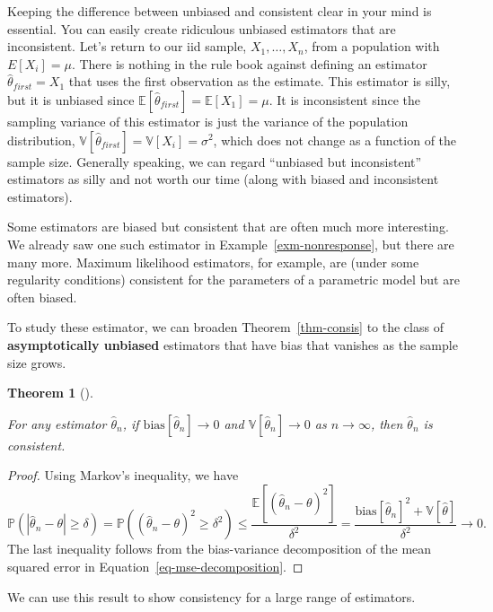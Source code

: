 \documentclass[
  13pt,
  letterpaper,
  DIV=11,
  numbers=noendperiod]{scrreprt}
\newcommand{\E}{\mathbb{E}}
\newcommand{\V}{\mathbb{V}}
\renewcommand{\P}{\mathbb{P}}
\theoremstyle{plain}
\newtheorem{theorem}{Theorem}[chapter]
\theoremstyle{definition}
\theoremstyle{definition}
\theoremstyle{remark}
\begin{document}
Keeping the difference between unbiased and consistent clear in your
mind is essential. You can easily create ridiculous unbiased estimators
that are inconsistent. Let's return to our iid sample,
\(X_1, \ldots, X_n\), from a population with \(E[X_i] = \mu\). There is
nothing in the rule book against defining an estimator
\(\widehat{\theta}_{first} = X_1\) that uses the first observation as
the estimate. This estimator is silly, but it is unbiased since
\(\E[\widehat{\theta}_{first}] = \E[X_1] = \mu\). It is inconsistent
since the sampling variance of this estimator is just the variance of
the population distribution,
\(\V[\widehat{\theta}_{first}] = \V[X_i] = \sigma^2\), which does not
change as a function of the sample size. Generally speaking, we can
regard ``unbiased but inconsistent'' estimators as silly and not worth
our time (along with biased and inconsistent estimators).

Some estimators are biased but consistent that are often much more
interesting. We already saw one such estimator in
Example~\ref{exm-nonresponse}, but there are many more. Maximum
likelihood estimators, for example, are (under some regularity
conditions) consistent for the parameters of a parametric model but are
often biased.

To study these estimator, we can broaden Theorem~\ref{thm-consis} to the
class of \textbf{asymptotically unbiased} estimators that have bias that
vanishes as the sample size grows.

\begin{theorem}[]\protect\hypertarget{thm-consis-2}{}\label{thm-consis-2}

For any estimator \(\widehat{\theta}_n\), if
\(\text{bias}[\widehat{\theta}_n] \to 0\) and
\(\V[\widehat{\theta}_n] \rightarrow 0\) as \(n\rightarrow \infty\),
then \(\widehat{\theta}_n\) is consistent.

\end{theorem}

\begin{proof}
Using Markov's inequality, we have \[
\P\left( |\widehat{\theta}_n - \theta| \geq \delta \right) = \P((\widehat{\theta}_n-\theta)^2 \geq \delta^2) \leq \frac{\E[(\widehat{\theta}_n - \theta)^2]}{\delta^2} = \frac{\text{bias}[\widehat{\theta}_n]^2 + \V[\widehat{\theta}]}{\delta^2} \to 0.
\] The last inequality follows from the bias-variance decomposition of
the mean squared error in Equation~\ref{eq-mse-decomposition}.
\end{proof}

We can use this result to show consistency for a large range of
estimators.
\end{document}

